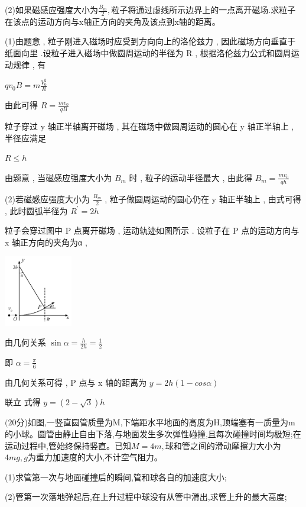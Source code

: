 (2)如果磁感应强度大小为$\frac{B_{m}}{2},$粒子将通过虚线所示边界上的一点离开磁场.求粒子在该点的运动方向与x轴正方向的夹角及该点到x轴的距离。
\begin{solution}{4cm}
(1)由题意 , 粒子刚进入磁场时应受到方向向上的洛伦兹力 , 因此磁场方向垂直于纸面向里 .设粒子进入磁场中做圆周运动的半径为 R , 根据洛伦兹力公式和圆周运动规律 , 有 

$qv_{0}B=m \frac{V_{0}^{2}}{R}$

由此可得 
$R= \frac{mv_{0}}{qB}$ 

粒子穿过 y 轴正半轴离开磁场 , 其在磁场中做圆周运动的圆心在 y 轴正半轴上 , 半径应满足

$R≤ h$ 

由题意 , 当磁感应强度大小为 $B _m$ 时 , 粒子的运动半径最大 , 由此得 
$B_{m}= \frac{mv_{0}}{qh}$ 

(2)若磁感应强度大小为  $\frac{B_{m}}{2}$  , 粒子做圆周运动的圆心仍在 y 轴正半轴上 , 由式可得 , 此时圆弧半径为 $R^\prime= 2 h$ 

粒子会穿过图中 P 点离开磁场 , 运动轨迹如图所示 . 设粒子在 P 点的运动方向与 x 轴正方向的夹角为α ,
\begin{center}
    \includegraphics[width=3cm]{img/imageA1.png}
\end{center}  
由几何关系 
$\sin \alpha = \frac{h}{2h}= \frac{1}{2}$ 

即
$\alpha = \frac{ \pi }{6}$

由几何关系可得 , P 点与 x 轴的距离为
$y = 2 h ( 1- cos α )$ 

联立 式得 
$y=(2- \sqrt{3})h$
\end{solution}

\question[6] $(20$分)如图,一竖直圆管质量为M,下端距水平地面的高度为H,顶端塞有一质量为m的小球。圆管由静止自由下落,与地面发生多次弹性碰撞,且每次碰撞时间均极短;在运动过程中,管始终保持竖直。已知$M=4m,$球和管之间的滑动摩擦力大小为$4mg,g$为重力加速度的大小,不计空气阻力。

(1)求管第一次与地面碰撞后的瞬间,管和球各自的加速度大小;

(2)管第一次落地弹起后,在上升过程中球没有从管中滑出,求管上升的最大高度;

